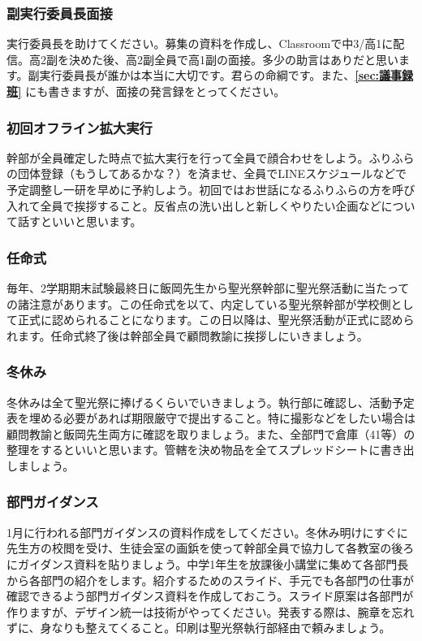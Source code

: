 \documentclass[dvipdfmx,jb5]{jarticle}
\begin{document}
\subsubsection{副実行委員長面接}
実行委員長を助けてください。募集の資料を作成し、Classroomで中3/高1に配信。高2副を決めた後、高2副全員で高1副の面接。多少の助言はありだと思います。副実行委員長が誰かは本当に大切です。君らの命綱です。また、{\bf \ref{sec:議事録班}} にも書きますが、面接の発言録をとってください。

\subsubsection{初回オフライン拡大実行}
幹部が全員確定した時点で拡大実行を行って全員で顔合わせをしよう。ふりふらの団体登録（もうしてあるかな？）を済ませ、全員でLINEスケジュールなどで予定調整し一研を早めに予約しよう。初回ではお世話になるふりふらの方を呼び入れて全員で挨拶すること。反省点の洗い出しと新しくやりたい企画などについて話すといいと思います。

\subsubsection{任命式}
毎年、2学期期末試験最終日に飯岡先生から聖光祭幹部に聖光祭活動に当たっての諸注意があります。この任命式を以て、内定している聖光祭幹部が学校側として正式に認められることになります。この日以降は、聖光祭活動が正式に認められます。任命式終了後は幹部全員で顧問教諭に挨拶しにいきましょう。

\subsubsection{冬休み}
冬休みは全て聖光祭に捧げるくらいでいきましょう。執行部に確認し、活動予定表を埋める必要があれば期限厳守で提出すること。特に撮影などをしたい場合は顧問教諭と飯岡先生両方に確認を取りましょう。また、全部門で倉庫（41等）の整理をするといいと思います。管轄を決め物品を全てスプレッドシートに書き出しましょう。

\subsubsection{部門ガイダンス}
1月に行われる部門ガイダンスの資料作成をしてください。冬休み明けにすぐに先生方の校閲を受け、生徒会室の画鋲を使って幹部全員で協力して各教室の後ろにガイダンス資料を貼りましょう。中学1年生を放課後小講堂に集めて各部門長から各部門の紹介をします。紹介するためのスライド、手元でも各部門の仕事が確認できるよう部門ガイダンス資料を作成しておこう。スライド原案は各部門が作りますが、デザイン統一は技術がやってください。発表する際は、腕章を忘れずに、身なりも整えてくること。印刷は聖光祭執行部経由で頼みましょう。
\end{document}
